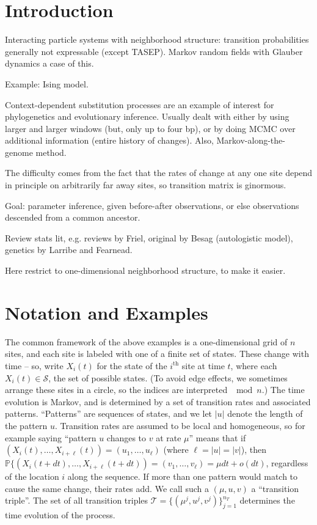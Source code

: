 \documentclass{article}
\renewcommand{\P}{\mathbb{P}}
\newcommand{\calS}{\mathcal{S}}  %
\newcommand{\calT}{\mathcal{T}}  %
\theoremstyle{plain}
\theoremstyle{definition}
\begin{document}
\section*{Introduction}

Interacting particle systems with neighborhood structure: transition probabilities generally not expressable (except TASEP).
Markov random fields with Glauber dynamics a case of this.

Example: Ising model.

Context-dependent substitution processes are an example of interest for phylogenetics and evolutionary inference.
Usually dealt with either by using larger and larger windows (but, only up to four bp),
or by doing MCMC over additional information (entire history of changes).
Also, Markov-along-the-genome method.

The difficulty comes from the fact that the rates of change at any one site depend in principle on arbitrarily far away sites,
so transition matrix is ginormous.

Goal: parameter inference, given before-after observations, or else observations descended from a common ancestor.

Review stats lit, e.g. reviews by Friel, original by Besag (autologistic model), genetics by Larribe and Fearnead.

Here restrict to one-dimensional neighborhood structure,
to make it easier.

\section{Notation and Examples}

The common framework of the above examples is a one-dimensional grid of $n$ sites,
and each site is labeled with one of a finite set of states.
These change with time -- so, write $X_i(t)$ for the state of the $i^\mathrm{th}$ site at time $t$,
where each $X_i(t) \in \calS$, the set of possible states.
(To avoid edge effects, we sometimes arrange these sites in a circle, so the indices are interpreted $\mod n$.)
The time evolution is Markov, and is determined by a set of transition rates and associated patterns.  
``Patterns'' are sequences of states, and we let $|u|$ denote the length of the pattern $u$.
Transition rates are assumed to be local and homogeneous, so for example saying ``pattern $u$ changes to $v$ at rate $\mu$''
means that if $(X_i(t), \ldots, X_{i+\ell}(t)) = (u_1, \ldots, u_\ell)$ (where $\ell=|u|=|v|$),
then $\P\{(X_i(t+dt), \ldots, X_{i+\ell}(t+dt)) = (v_1, \ldots, v_\ell) = \mu dt + o(dt)$,
regardless of the location $i$ along the sequence.
If more than one pattern would match to cause the same change, their rates add.
We call such a $(\mu,u,v)$ a ``transition triple''.
The set of all transition triples $\calT = \{ (\mu^j,u^j,v^j) \}_{j=1}^{n_T}$ 
determines the time evolution of the process.
\end{document}
